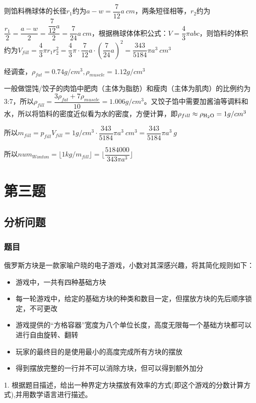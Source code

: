 \documentclass[lang=cn,a4paper]{elegantpaper}
\begin{document}
    则馅料椭球体的长径$r_1$约为$a-w=\dfrac{7}{12}a~cm$，两条短径相等，$r_2$约为$\dfrac{r_1}{2}=\dfrac{a-w}{2}=\dfrac{\dfrac{7}{12}a}{2}=\dfrac{7}{24}a~cm$，根据椭球体体积公式：$V=\dfrac{4}{3}\pi abc$，则馅料的体积约为$V_{fill}=\dfrac{4}{3}\pi r_1r_2^2=\dfrac{4}{3}\pi \cdot \dfrac{7}{12}a \cdot (\dfrac{7}{24}a)^2=\dfrac{343}{5184}\pi a^3~cm^3$

    经调查，$\rho_{fat}=0.74g/cm^3,\rho_{muscle}=1.12g/cm^3$
    
    一般做馄饨/饺子的肉馅中肥肉（主体为脂肪）和瘦肉（主体为肌肉）的比例约为3:7，所以$\rho_{fill}=\dfrac{3\rho_{fat}+7\rho_{muscle}}{10}=1.006g/cm^3$。又饺子馅中需要加酱油等调料和水，所以将馅料的密度近似看为水的密度，方便计算，即$\rho_{fill}\approx\rho_{\ce{H2O}}=1g/cm^3$

    所以$m_{fill}=p_{fill}V_{fill}=1g/cm^3 \cdot \dfrac{343}{5184}\pi a^3~cm^3=\dfrac{343}{5184}\pi a^3~g$

    所以$num_{Wonton}=\lfloor 1kg/m_{fill} \rfloor=\lfloor \dfrac{5184000}{343\pi a^3}\rfloor$
    \clearpage
    \section{第三题}
    \subsection{分析问题}
    \subsubsection*{题目}
    俄罗斯方块是一款家喻户晓的电子游戏，小数对其深感兴趣，将其简化规则如下：
    \begin{itemize}
        \item 游戏中，一共有四种基础方块
        \item 每一轮游戏中，给定的基础方块的种类和数目一定，但摆放方块的先后顺序锁定，不可更改
        \item 游戏提供的“方格容器”宽度为八个单位长度，高度无限每一个基础方块都可以进行自由旋转、翻转
        \item 玩家的最终目的是使用最小的高度完成所有方块的摆放
        \item 得到摆放完整的一行并不可以消除方块，但可以得到额外加分
    \end{itemize}

    1. 根据题目描述，给出一种界定方块摆放有效率的方式(即这个游戏的分数计算方式),并用数学语言进行描述。
\end{document}
